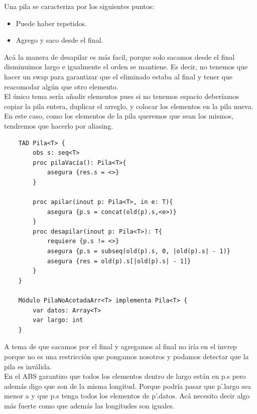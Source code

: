 \documentclass[10pt,a4paper]{article}
\begin{document}
Una pila se caracteriza por los siguientes puntos:
\begin{itemize}
    \item Puede haber repetidos. 
    \item Agrego y saco desde el final.
\end{itemize}
Acá la manera de desapilar es más facil, porque solo sacamos desde el final disminuimos largo e igualmente el orden se mantiene. Es decir, no tenemos que hacer un swap para garantizar que el eliminado estaba al final y tener que reacomodar algún que otro elemento. \\
El único tema sería añadir elementos pues si no tenemos espacio deberíamos copiar la pila entera, duplicar el arreglo, y colocar los elementos en la pila nueva. En este caso, como los elementos de la pila queremos que sean los mismos, tendremos que hacerlo por aliasing.
\begin{lstlisting}
    TAD Pila<T> {
        obs s: seq<T>
        proc pilaVacía(): Pila<T>{
            asegura {res.s = <>}
        }

        proc apilar(inout p: Pila<T>, in e: T){
            asegura {p.s = concat(old(p).s,<e>)}
        }
        proc desapilar(inout p: Pila<T>): T{
            requiere {p.s != <>}
            asegura {p.s = subseq(old(p).s, 0, |old(p).s| - 1)}
            asegura {res = old(p).s[|old(p).s| - 1]}
        }
    }

    Módulo PilaNoAcotadaArr<T> implementa Pila<T> {
        var datos: Array<T>
        var largo: int
    }
\end{lstlisting}
A tema de que sacamos por el final y agregamos al final no iría en el invrep porque no es una restricción que pongamos nosotros y podamos detectar que la pila es inválida. \\
En el ABS garantizo que todos los elementos dentro de largo están en p.s pero además digo que son de la misma longitud. Porque podría pasar que p'.largo sea menor a  y que p.s tenga todos los elementos de p'.datos. Acá necesito decir algo más fuerte como que además las longitudes son iguales.
\end{document}
